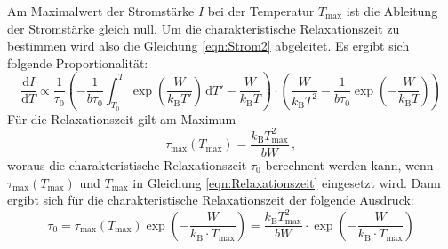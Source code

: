         \noindent Am Maximalwert der Stromstärke $I$ bei der Temperatur $T_\text{max}$ ist die Ableitung der Stromstärke gleich null. Um die charakteristische Relaxationszeit zu bestimmen
        wird also die Gleichung \eqref{eqn:Strom2} abgeleitet. Es ergibt sich folgende Proportionalität:
        \begin{equation}
            \frac{\text{d}I}{\text{d}T} \propto \frac{1}{\tau_0} \left(- \frac{1}{b \tau_0} \int_{T_0}^T \exp\left(\frac{W}{k_\text{B} T'}\right) \, \text{d}T' - \frac{W}{k_\text{B} T}\right) \cdot \left( \frac{W}{k_\text{B}T^2} - \frac{1}{b\tau_0}\exp\left(- \frac{W}{k_\text{B} T}\right)\right)
            \label{eqn:relaxa}
        \end{equation}
        Für die Relaxationszeit gilt am Maximum 
        \begin{equation}
            \tau_{\text{max}} (T_{\text{max}}) = \frac{k_\text{B} T^2_{\text{max}}}{b W}\, ,
        \end{equation}
        woraus die charakteristische Relaxationszeit $\tau_0$ berechnent werden kann, wenn $\tau_{\text{max}} (T_{\text{max}})$ und $T_{\text{max}}$ in Gleichung \eqref{eqn:Relaxationszeit} eingesetzt wird.
        Dann ergibt sich für die charakteristische Relaxationszeit der folgende Ausdruck:
        \begin{equation}
            \tau_0 = \tau_{\text{max}} (T_{\text{max}}) \exp \left(- \frac{W}{k_{\text{B}} \cdot T_\text{max}}\right) = \frac{k_\text{B} T^2_{\text{max}}}{b W} \cdot\exp \left(- \frac{W}{k_{\text{B}} \cdot T_\text{max}}\right)
            \label{eqn:auswertungrelax}
        \end{equation}